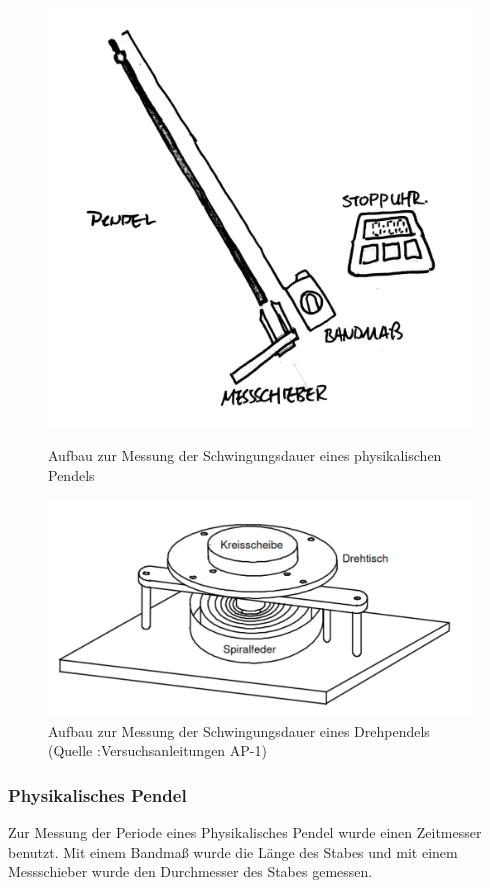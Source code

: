 \documentclass[11pt,a4paper]{article} %
\begin{document}
\begin{figure}[h]
	\centering
	\includegraphics[scale=0.1]{Abb1}
	\caption{Aufbau zur Messung der Schwingungsdauer eines physikalischen Pendels}
	\includegraphics[scale=0.5]{Abb2}
	\caption{Aufbau zur Messung der Schwingungsdauer eines Drehpendels (Quelle
		:Versuchsanleitungen AP-1)}
	
	
	
\end{figure}

\subsubsection{Physikalisches Pendel}
Zur Messung der Periode eines Physikalisches Pendel wurde einen Zeitmesser benutzt. Mit einem Bandmaß wurde die Länge des Stabes und mit einem Messschieber wurde den Durchmesser des Stabes gemessen. 
\end{document}
